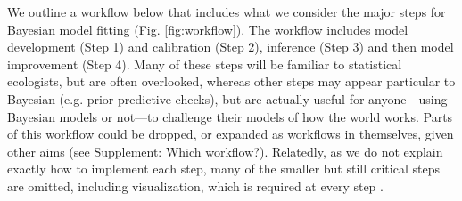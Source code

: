 \documentclass[11pt]{article}
\providecommand{\DIFaddtex}[1]{{\protect\color{blue}\uwave{#1}}} %
\providecommand{\DIFdeltex}[1]{{\protect\color{red}\sout{#1}}}                      %
\providecommand{\DIFaddbegin}{} %
\providecommand{\DIFaddend}{} %
\providecommand{\DIFdelbegin}{} %
\providecommand{\DIFdelend}{} %
\providecommand{\DIFadd}[1]{\texorpdfstring{\DIFaddtex{#1}}{#1}} %
\providecommand{\DIFdel}[1]{\texorpdfstring{\DIFdeltex{#1}}{}} %
\newcommand{\DIFscaledelfig}{0.5}
\newlength{\DIFdelgraphicswidth} %
\newlength{\DIFdelgraphicsheight} %
\newcommand{\DIFaddincludegraphics}[2][]{{\color{blue}\fbox{\DIFOincludegraphics[#1]{#2}}}} %
\newcommand{\DIFdelincludegraphics}[2][]{%
\sbox{\DIFdelgraphicsbox}{\DIFOincludegraphics[#1]{#2}}%
\settoboxwidth{\DIFdelgraphicswidth}{\DIFdelgraphicsbox} %
\settoboxtotalheight{\DIFdelgraphicsheight}{\DIFdelgraphicsbox} %
\scalebox{\DIFscaledelfig}{%
\parbox[b]{\DIFdelgraphicswidth}{\usebox{\DIFdelgraphicsbox}\\[-\baselineskip] \rule{\DIFdelgraphicswidth}{0em}}\llap{\resizebox{\DIFdelgraphicswidth}{\DIFdelgraphicsheight}{%
\setlength{\unitlength}{\DIFdelgraphicswidth}%
\begin{picture}(1,1)%
\thicklines\linethickness{2pt} %
{\color[rgb]{1,0,0}\put(0,0){\framebox(1,1){}}}%
{\color[rgb]{1,0,0}\put(0,0){\line( 1,1){1}}}%
{\color[rgb]{1,0,0}\put(0,1){\line(1,-1){1}}}%
\end{picture}%
}\hspace*{3pt}}} %
} %
\DeclareRobustCommand{\DIFaddbegin}{\DIFOaddbegin \let\includegraphics\DIFaddincludegraphics} %
\DeclareRobustCommand{\DIFaddend}{\DIFOaddend \let\includegraphics\DIFOincludegraphics} %
\DeclareRobustCommand{\DIFdelbegin}{\DIFOdelbegin \let\includegraphics\DIFdelincludegraphics} %
\DeclareRobustCommand{\DIFdelend}{\DIFOaddend \let\includegraphics\DIFOincludegraphics} %
\begin{document}
\DIFaddend %
We outline a workflow below that includes what we consider the major steps for Bayesian model fitting (Fig. \ref{fig:workflow}). The workflow includes model development (Step 1) and calibration (Step 2), inference (Step 3) and then model improvement (Step 4). Many of these steps will be familiar to statistical ecologists, but are often overlooked, whereas other steps may appear particular to Bayesian (e.g. prior predictive checks), but are actually useful for anyone---using Bayesian models or not---to challenge their models of how the world works. Parts of this workflow could be dropped, or expanded as workflows in themselves, given other aims (see Supplement: Which workflow?). Relatedly, as we do not explain exactly how to implement each step, many of the smaller but still critical steps are omitted, including visualization, which is required at every step \citep[and for which there are many good resources, e.g.][]{gabryvis}. 

\DIFaddbegin 
\DIFaddend 
\end{document}

